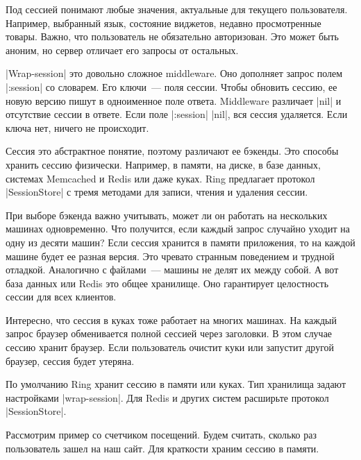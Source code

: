 Под сессией понимают любые значения, актуальные для текущего
пользователя. Например, выбранный язык, состояние виджетов, недавно
просмотренные товары. Важно, что пользователь не обязательно авторизован. Это
может быть аноним, но сервер отличает его запросы от остальных.

\spverb|Wrap-session| это довольно сложное middleware. Оно дополняет запрос
полем \spverb|:session| со словарем. Его ключи~--- поля сессии. Чтобы обновить
сессию, ее новую версию пишут в одноименное поле ответа. Middleware различает
\spverb|nil| и отсутствие сессии в ответе. Если поле \spverb|:session|
\spverb|nil|, вся сессия удаляется. Если ключа нет, ничего не происходит.

Сессия это абстрактное понятие, поэтому различают ее бэкенды. Это способы
хранить сессию физически. Например, в памяти, на диске, в базе данных, системах
Memcached и Redis или даже куках. Ring предлагает протокол
\spverb|SessionStore| с тремя методами для записи, чтения и удаления сессии.

При выборе бэкенда важно учитывать, может ли он работать на нескольких машинах
одновременно. Что получится, если каждый запрос случайно уходит на одну из
десяти машин? Если сессия хранится в памяти приложения, то на каждой машине
будет ее разная версия. Это чревато странным поведением и трудной
отладкой. Аналогично с файлами~--- машины не делят их между собой. А вот база
данных или Redis это общее хранилище. Оно гарантирует целостность сессии для
всех клиентов.

Интересно, что сессия в куках тоже работает на многих машинах. На каждый запрос
браузер обменивается полной сессией через заголовки. В этом случае сессию
хранит браузер. Если пользователь очистит куки или запустит другой
браузер, сессия будет утеряна.

По умолчанию Ring хранит сессию в памяти или куках. Тип хранилища
задают настройками \spverb|wrap-session|. Для Redis и других систем расширьте
протокол \spverb|SessionStore|.

Рассмотрим пример со счетчиком посещений. Будем считать, сколько раз
пользователь зашел на наш сайт. Для краткости храним сессию в памяти.

\begin{english}
\end{english}

